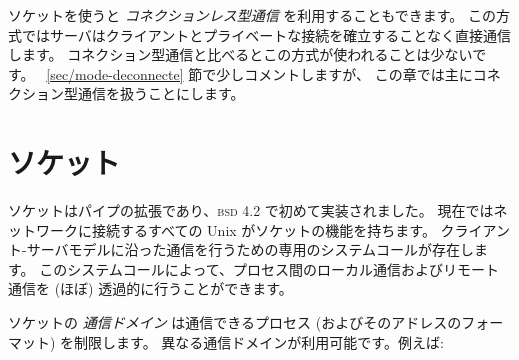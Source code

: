 ソケットを使うと \emph{コネクションレス型通信} を利用することもできます。
この方式ではサーバはクライアントとプライベートな接続を確立することなく直接通信します。
コネクション型通信と比べるとこの方式が使われることは少ないです。
~\ref{sec/mode-deconnecte} 節で少しコメントしますが、
この章では主にコネクション型通信を扱うことにします。

\section{ソケット}

ソケットはパイプの拡張であり、\textsc{bsd} 4.2 で初めて実装されました。
現在ではネットワークに接続するすべての Unix がソケットの機能を持ちます。
クライアント-サーバモデルに沿った通信を行うための専用のシステムコールが存在します。
このシステムコールによって、プロセス間のローカル通信およびリモート通信を (ほぼ) 透過的に行うことができます。

ソケットの \emph{通信ドメイン} は通信できるプロセス (およびそのアドレスのフォーマット) を制限します。
異なる通信ドメインが利用可能です。例えば:

